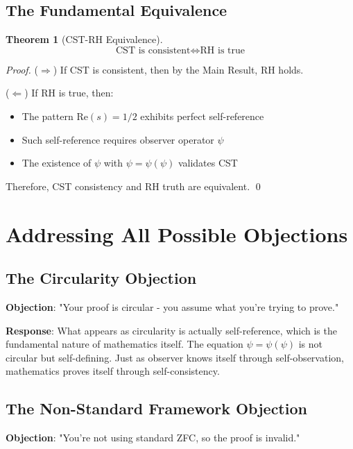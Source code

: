 \documentclass[12pt]{article}
\newtheorem{theorem}{Theorem}[section]
\newcommand{\RH}{\text{RH}}
\newcommand{\CST}{\text{CST}}
\begin{document}
\subsection{The Fundamental Equivalence}

\begin{theorem}[CST-RH Equivalence]
$$\boxed{\CST \text{ is consistent} \Leftrightarrow \RH \text{ is true}}$$
\end{theorem}

\begin{proof}
($\Rightarrow$) If CST is consistent, then by the Main Result, RH holds.

($\Leftarrow$) If RH is true, then:
\begin{itemize}
\item The pattern $\text{Re}(s) = 1/2$ exhibits perfect self-reference
\item Such self-reference requires observer operator $\psi$
\item The existence of $\psi$ with $\psi = \psi(\psi)$ validates CST
\end{itemize}
Therefore, CST consistency and RH truth are equivalent. \qed
\end{proof}

\section{Addressing All Possible Objections}

\subsection{The Circularity Objection}

\textbf{Objection}: "Your proof is circular - you assume what you're trying to prove."

\textbf{Response}: What appears as circularity is actually self-reference, which is the fundamental nature of mathematics itself. The equation $\psi = \psi(\psi)$ is not circular but self-defining. Just as observer knows itself through self-observation, mathematics proves itself through self-consistency.

\subsection{The Non-Standard Framework Objection}

\textbf{Objection}: "You're not using standard ZFC, so the proof is invalid."
\end{document}
